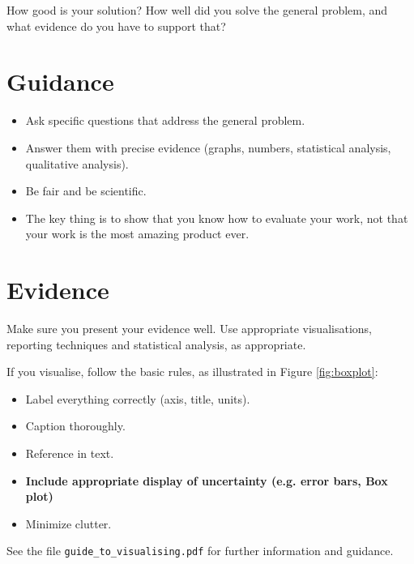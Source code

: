 \documentclass{l4proj}
\begin{document}
How good is your solution? How well did you solve the general problem, and what evidence do you have to support that?

\section{Guidance}
\begin{itemize}
    \item
        Ask specific questions that address the general problem.
    \item
        Answer them with precise evidence (graphs, numbers, statistical
        analysis, qualitative analysis).
    \item
        Be fair and be scientific.
    \item
        The key thing is to show that you know how to evaluate your work, not
        that your work is the most amazing product ever.
\end{itemize}

\section{Evidence}





Make sure you present your evidence well. Use appropriate visualisations, reporting techniques and statistical analysis, as appropriate.

If you visualise, follow the basic rules, as illustrated in Figure \ref{fig:boxplot}:
\begin{itemize}
\item Label everything correctly (axis, title, units).
\item Caption thoroughly.
\item Reference in text.
\item \textbf{Include appropriate display of uncertainty (e.g. error bars, Box plot)}
\item Minimize clutter.
\end{itemize}

See the file \texttt{guide\_to\_visualising.pdf} for further information and guidance.
\end{document}
